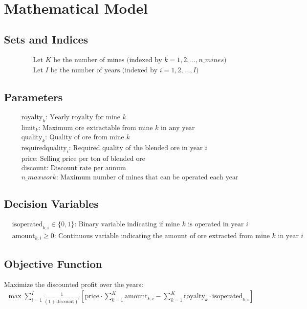 \documentclass{article}
\begin{document}
\section*{Mathematical Model}

\subsection*{Sets and Indices}
\begin{align*}
& \text{Let } K \text{ be the number of mines (indexed by } k = 1, 2, \ldots, n\_mines\text{)} \\
& \text{Let } I \text{ be the number of years (indexed by } i = 1, 2, \ldots, I\text{)}
\end{align*}

\subsection*{Parameters}
\begin{align*}
& \text{royalty}_{k} \text{: Yearly royalty for mine } k \\
& \text{limit}_{k} \text{: Maximum ore extractable from mine } k \text{ in any year} \\
& \text{quality}_{k} \text{: Quality of ore from mine } k \\
& \text{requiredquality}_{i} \text{: Required quality of the blended ore in year } i \\
& \text{price} \text{: Selling price per ton of blended ore} \\
& \text{discount} \text{: Discount rate per annum} \\
& n\_maxwork \text{: Maximum number of mines that can be operated each year}
\end{align*}

\subsection*{Decision Variables}
\begin{align*}
& \text{isoperated}_{k,i} \in \{0, 1\} \text{: Binary variable indicating if mine } k \text{ is operated in year } i \\
& \text{amount}_{k,i} \geq 0 \text{: Continuous variable indicating the amount of ore extracted from mine } k \text{ in year } i
\end{align*}

\subsection*{Objective Function}
Maximize the discounted profit over the years:
\begin{align*}
\max \sum_{i=1}^{I} \frac{1}{(1 + \text{discount})^i} \left[ \text{price} \cdot \sum_{k=1}^{K} \text{amount}_{k,i} - \sum_{k=1}^{K} \text{royalty}_{k} \cdot \text{isoperated}_{k,i} \right]
\end{align*}
\end{document}
